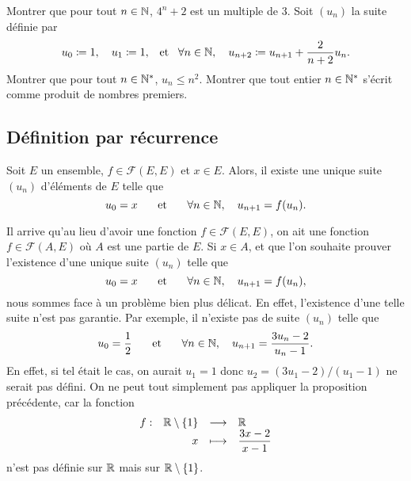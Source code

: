\documentclass{magnolia}
\begin{document}
\begin{exos}
\exo Montrer que pour tout $n\in\mathbb{N}$, $4^n+2$ est un multiple de 3.
\exo Soit $(u_n)$ la suite définie par
  \[u_0\coloneqq 1,\quad u_1\coloneqq 1, \quad\!\text{et}\quad\! \forall n\in\mathbb{N},\quad u_{n+2}\coloneqq u_{n+1}+\frac{2}{n+2}u_n.\]
  Montrer que pour tout $n\in{\mathbb{N}^*}$, $u_n\leq n^2$.
\exo
  Montrer que tout entier $n\in{\mathbb{N}^*}$ s'écrit comme produit
  de nombres premiers.
\end{exos}



\subsection{Définition par récurrence}

\begin{proposition}
Soit $E$ un ensemble, $f\in\mathcal{F}(E,E)$  et $x\in E$. Alors, il existe une unique
suite $(u_n)$ d'éléments de $E$ telle que
\[u_0=x \quad\quad\!\text{et}\quad\!\quad \forall n\in\mathbb{N},\quad u_{n+1}=f(u_n).\]
\end{proposition}

\begin{remarqueUnique}
\remarque Il arrive qu'au lieu d'avoir une fonction $f\in\mathcal{F}(E,E)$,
  on ait une fonction $f\in\mathcal{F}(A, E)$ où $A$ est une partie de $E$. Si $x\in A$,
  et que l'on souhaite prouver l'existence d'une unique suite $(u_n)$ telle que
  \[u_0=x \quad\quad\!\text{et}\quad\!\quad \forall n\in\mathbb{N},\quad u_{n+1}=f(u_n),\]
  nous sommes face à un problème bien plus délicat. En effet, l'existence d'une
  telle suite n'est pas garantie. 
  Par exemple, il n'existe pas de suite $(u_n)$ telle que
  \[u_0=\frac{1}{2} \quad\quad\!\text{et}\quad\!\quad \forall n\in\mathbb{N},\quad u_{n+1}=\frac{3 u_n-2}{u_n-1}.\]
  En effet, si tel était le cas,
  on aurait $u_1=1$ donc $u_2=(3u_1-2)/(u_1-1)$ ne serait pas défini. On ne peut tout
  simplement pas appliquer la proposition précédente, car la fonction
  \[\begin{array}[t]{lrcl} \displaystyle{f} : & \displaystyle{\mathbb{R}\setminus\left\{1\right\}} & \longrightarrow & \displaystyle{\mathbb{R}} \\ & \displaystyle{x} & \longmapsto & \displaystyle{\frac{3x-2}{x-1}} \end{array}\]
  n'est pas définie sur $\mathbb{R}$ mais sur $\mathbb{R}\setminus\left\{1\right\}$.
\end{remarqueUnique} 
\end{document}
